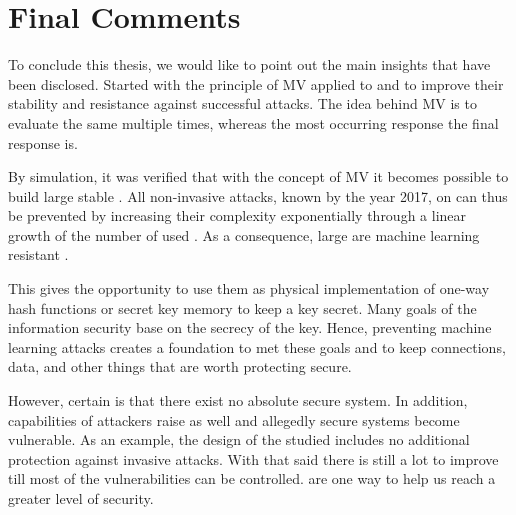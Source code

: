 
\section{Final Comments}

To conclude this thesis, we would like to point out the main insights that have been disclosed.
Started with the principle of \ac{MV} applied to \apufs and \xpufs to improve their stability and resistance against successful attacks.
The idea behind \ac{MV} is to evaluate the same \puf multiple times, whereas the most occurring response the final response is.

By simulation, it was verified that with the concept of \ac{MV} it becomes possible to build large stable \mxpufs.
All non-invasive attacks, known by the year 2017, on \xpufs can thus be prevented by increasing their complexity exponentially through a linear growth of the number of used \mpufs.
As a consequence, large \mxpufs are machine learning resistant \pufs.

This gives the opportunity to use them as physical implementation of one-way hash functions or secret key memory to keep a key secret.
Many goals of the information security base on the secrecy of the key.
Hence, preventing machine learning attacks creates a foundation to met these goals and to keep connections, data, and other things that are worth protecting secure.

However, certain is that there exist no absolute secure system.
In addition, capabilities of attackers raise as well and allegedly secure systems become vulnerable.
As an example, the design of the studied \apuf includes no additional protection against invasive attacks.
With that said there is still a lot to improve till most of the vulnerabilities can be controlled.
\pufs are one way to help us reach a greater level of security.

